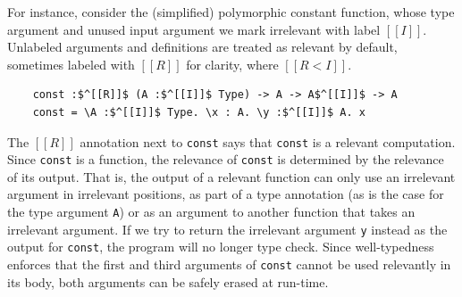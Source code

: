 \documentclass[acmsmall]{acmart}
\begin{document}
For instance, consider the (simplified) polymorphic constant function,
whose type argument and unused input argument we mark irrelevant with label $[[I]]$. Unlabeled
arguments and definitions are treated as relevant by default,
sometimes labeled with $[[R]]$ for clarity, where  $[[R < I]]$.
\begin{lstlisting}
    const :$^[[R]]$ (A :$^[[I]]$ Type) -> A -> A$^[[I]]$ -> A
    const = \A :$^[[I]]$ Type. \x : A. \y :$^[[I]]$ A. x
\end{lstlisting}
The $[[R]]$ annotation next to \lstinline|const| says that
\lstinline|const| is a relevant computation. Since \lstinline|const|
is a function, the relevance of \lstinline|const| is determined by the
relevance of its output. That is, the output of a relevant function
can only use an irrelevant argument in irrelevant positions, as part
of a type annotation (as is the case for the type argument
\lstinline|A|) or as an argument to another function that takes an
irrelevant argument. If we try to return the irrelevant argument
\lstinline|y| instead as the output for \lstinline|const|, the
program will no longer type check.
Since well-typedness enforces that the first and third arguments of
\lstinline|const| cannot be used relevantly in its body, both
arguments can be safely erased at run-time.


\end{document}
